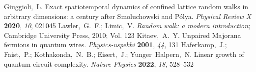 \documentclass[journal=jctcce,a4paper,manuscript=article]{achemso}
\begin{document}
\begin{mcitethebibliography}{41}
  \EndOfBibitem
  Giuggioli,~L. Exact spatiotemporal dynamics of confined lattice random walks in arbitrary dimensions: a century after Smoluchowski and P{\'o}lya. \emph{Physical Review X} \textbf{2020}, \emph{10}, 021045\relax
  \mciteBstWouldAddEndPuncttrue
  \mciteSetBstMidEndSepPunct{\mcitedefaultmidpunct}
  {\mcitedefaultendpunct}{\mcitedefaultseppunct}\relax
  \EndOfBibitem
  Lawler,~G.~F.; Limic,~V. \emph{Random walk: a modern introduction}; Cambridge University Press, 2010; Vol. 123\relax
  \mciteBstWouldAddEndPuncttrue
  \mciteSetBstMidEndSepPunct{\mcitedefaultmidpunct}
  {\mcitedefaultendpunct}{\mcitedefaultseppunct}\relax
  \EndOfBibitem
  Kitaev,~A.~Y. Unpaired Majorana fermions in quantum wires. \emph{Physics-uspekhi} \textbf{2001}, \emph{44}, 131\relax
  \mciteBstWouldAddEndPuncttrue
  \mciteSetBstMidEndSepPunct{\mcitedefaultmidpunct}
  {\mcitedefaultendpunct}{\mcitedefaultseppunct}\relax
  \EndOfBibitem
  Haferkamp,~J.; Faist,~P.; Kothakonda,~N.~B.; Eisert,~J.; Yunger~Halpern,~N. Linear growth of quantum circuit complexity. \emph{Nature Physics} \textbf{2022}, \emph{18}, 528--532\relax
  \mciteBstWouldAddEndPuncttrue
  \mciteSetBstMidEndSepPunct{\mcitedefaultmidpunct}
  {\mcitedefaultendpunct}{\mcitedefaultseppunct}\relax
  \EndOfBibitem
\end{mcitethebibliography}
\end{document}
